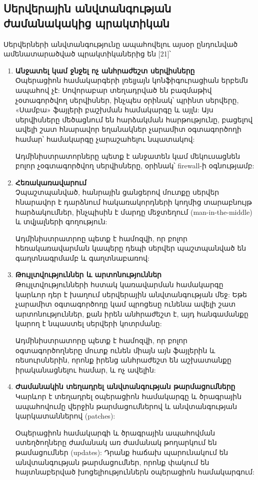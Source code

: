 \documentclass[a4paper,12pt]{article}
\begin{document}
\begin{sloppypar}
\subsection{Սերվերային անվտանգության ժամանակակից պրակտիկան}


Սերվերների անվտանգությունը ապահովելու այսօր ընդունված ամենատարածված
պրակտիկաներից են [21]՝

\begin{enumerate}
\item \textbf{Անջատել կամ ջնջել ոչ անհրաժեշտ սերվիսները}\\
    Օպերացիոն համակարգերի լռելյայն կոնֆիգուրացիան երբեմն ապահով չէ:
    Սովորաբար տեղադրված են բազմաթիվ չօտագործվող սերվիսներ, ինչպես
    օրինակ՝ պրինտ սերվերը, «Սամբա» ֆայլերի բաշխման համակարգը և այլն:
	Այս սերվիսները
    մեծացնում են հարձակման հարթությունը, բացելով ավելի շատ հնարավոր եղանակներ
    չարամիտ օգտագործողի համար՝ համակարգը չարաշահելու նպատակով:

    Ադմինիստրատորները պետք է անջատեն կամ մեկուսացնեն բոլոր չօգտագործվող
    սերվիսները, օրինակ՝ firewall-ի օգնությամբ:
\item \textbf{Հեռակառավարում}\\
    Չպաշտպանված, հանրային ցանցերով մուտքը սերվեր հնարավոր է դարձնում
    հակառակորդների կողմից տարաբնույթ հարձակումներ, ինչպիսին է
    մարդը մեջտեղում (man-in-the-middle) և տվյալների գողություն:

    Ադմինիստրատրոը պետք է համոզվի, որ բոլոր հեռակառավարման կապերը
    դեպի սերվեր պաշտպանված են գաղտնագրմամբ և գաղտնաբառով:
\item \textbf{Թույլտվություններ և արտոնություններ}\\
    Թույլտվությունների հստակ կառավարման համակարգը կարևոր դեր է խաղում
    սերվերային անվտանգության մեջ: Եթե չարամիտ օգտագործողը կամ պրոցեսը
    ունենա ավելի շատ արտոնություններ, քան իրեն անհրաժեշտ է, այդ հանգամանքը
    կարող է նպաստել սերվերի կոտրմանը:

    Ադմինիստրատորը պետք է համոզվի, որ բոլոր օգտագործողները մուտք ունեն
    միայն այն ֆայլերին և ռեսուրսներին, որոնք իրենց անհրաժեշտ են
    աշխատանքը իրականացնելու համար, և ոչ ավելին:
\item \textbf{Ժամանակին տեղադրել անվտանգության թարմացումները}\\
    Կարևոր է տեղադրել օպերացիոն համակարգը և ծրագրային ապահովումը
    վերջին թարմացումներով և անվտանգության կարկատաններով (patches):

	Օպերացիոն համակարգի և ծրագրային ապահովման ստեղծողները ժամանակ
	առ ժամանակ թողարկում են թամացումներ (updates):
	Դրանք հաճախ պարունակում են անվտանգության թարմացումներ, որոնք
	փակում են հայտնաբերված խոցելիություններն օպերացիոն համակարգում:


\end{enumerate}
\end{sloppypar}
\end{document}
